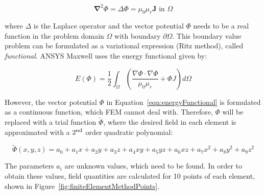 \begin{equation}
	\mathbf{\nabla}^{2} \Phi = \Delta \Phi = \mu_{0}\mu_{r}\mathbf{J} \text{ in } \Omega
	\label{eqn:vectorPotentialPoissonEquation}
\end{equation}

where $\Delta$ is the Laplace operator and the vector potential $\Phi$ needs to be a real function in the problem domain $\Omega$ with boundary $\partial \Omega$. This boundary value problem can be formulated as a variational expression (Ritz method), called \textit{functional}. ANSYS Maxwell uses the energy functional given by:

\begin{equation}
	E(\Phi) = \frac{1}{2}\int_{\Omega}\left(\frac{\nabla\Phi \cdot \nabla\Phi}{\mu_{0}\mu_{r}}+\Phi J\right)d\Omega
	\label{eqn:energyFunctional}
\end{equation}

However, the vector potential $\Phi$ in Equation~\ref{eqn:energyFunctional} is formulated as a continuous function, which FEM cannot deal with. Therefore, $\Phi$ will be replaced with a trial function $\tilde{\Phi}$, where the desired field in each element is approximated with a $2\textsuperscript{nd}$ order quadratic polynomial:

\begin{equation}
	\tilde{\Phi}(x,y,z) = a_{0}+a_{1}x+a_{2}y+a_{3}z+a_{4}xy+a_{5}yz+a_{6}xz+a_{7}x^{2}+a_{8}y^{2}+a_{9}z^{2}
	\label{eqn:basisFunction}
\end{equation}

The parameters $a_{i}$ are unknown values, which need to be found. In order to obtain these values, field quantities are calculated for 10 points of each element, shown in Figure~\ref{fig:finiteElementMethodPoints}. 

